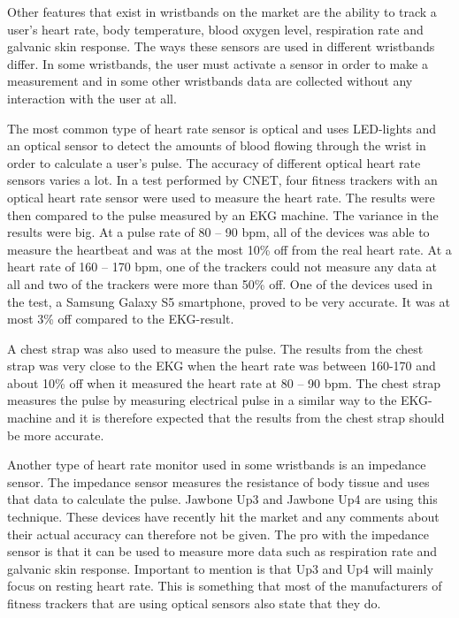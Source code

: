 \documentclass{cslthse-msc}
\begin{document}
Other features that exist in wristbands on the market are the ability to track a user's heart rate, body temperature, blood oxygen level, respiration rate and galvanic skin response. The ways these sensors are used in different wristbands differ. In some wristbands, the user must activate a sensor in order to make a measurement and in some other wristbands data are collected without any interaction with the user at all.

The most common type of heart rate sensor is optical and uses LED-lights and an optical sensor to detect the amounts of blood flowing through the wrist in order to calculate a user’s pulse. The accuracy of different optical heart rate sensors varies a lot. In a test performed by CNET, four fitness trackers with an optical heart rate sensor were used to measure the heart rate. The results were then compared to the pulse measured by an EKG machine. The variance in the results were big.  At a pulse rate of 80 – 90 bpm, all of the devices was able to measure the heartbeat and was at the most 10\% off from the real heart rate. At a heart rate of 160 – 170 bpm, one of the trackers could not measure any data at all and two of the trackers were more than 50\% off\cite{CNET}. One of the devices used in the test, a Samsung Galaxy S5 smartphone, proved to be very accurate. It was at most 3\% off compared to the EKG-result.

A chest strap was also used to measure the pulse. The results from the chest strap was very close to the EKG when the heart rate was between 160-170 and about 10\% off when it measured the heart rate at 80 – 90 bpm. The chest strap measures the pulse by measuring electrical pulse in a similar way to the EKG-machine and it is therefore expected that the results from the chest strap should be more accurate. 

Another type of heart rate monitor used in some wristbands is an impedance sensor. The impedance sensor measures the resistance of body tissue and uses that data to calculate the pulse. Jawbone Up3 and Jawbone Up4 are using this technique. These devices have recently hit the market and any comments about their actual accuracy can therefore not be given. The pro with the impedance sensor is that it can be used to measure more data such as respiration rate and galvanic skin response. Important to mention is that Up3 and Up4 will mainly focus on resting heart rate. This is something that most of the manufacturers of fitness trackers that are using optical sensors also state that they do. 
\end{document}
